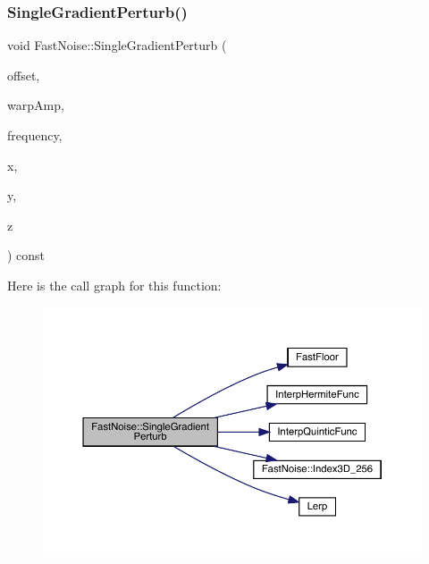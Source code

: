 \subsubsection{\texorpdfstring{Single\+Gradient\+Perturb()}{SingleGradientPerturb()}\hspace{0.1cm}{\footnotesize\ttfamily [2/2]}}
{\footnotesize\ttfamily void Fast\+Noise\+::\+Single\+Gradient\+Perturb (\begin{DoxyParamCaption}\item[{unsigned char}]{offset,  }\item[{\mbox{\hyperlink{_fast_noise_8h_a75a9ef6d2541c4921815b885bfd449c3}{F\+N\+\_\+\+D\+E\+C\+I\+M\+AL}}}]{warp\+Amp,  }\item[{\mbox{\hyperlink{_fast_noise_8h_a75a9ef6d2541c4921815b885bfd449c3}{F\+N\+\_\+\+D\+E\+C\+I\+M\+AL}}}]{frequency,  }\item[{\mbox{\hyperlink{_fast_noise_8h_a75a9ef6d2541c4921815b885bfd449c3}{F\+N\+\_\+\+D\+E\+C\+I\+M\+AL}} \&}]{x,  }\item[{\mbox{\hyperlink{_fast_noise_8h_a75a9ef6d2541c4921815b885bfd449c3}{F\+N\+\_\+\+D\+E\+C\+I\+M\+AL}} \&}]{y,  }\item[{\mbox{\hyperlink{_fast_noise_8h_a75a9ef6d2541c4921815b885bfd449c3}{F\+N\+\_\+\+D\+E\+C\+I\+M\+AL}} \&}]{z }\end{DoxyParamCaption}) const\hspace{0.3cm}{\ttfamily [private]}}

Here is the call graph for this function\+:
\nopagebreak
\begin{figure}[H]
\begin{center}
\leavevmode
\includegraphics[width=350pt]{d1/dd8/class_fast_noise_ac584dcaa35fdc6d8af986eba0d3ed50e_cgraph}
\end{center}
\end{figure}
\mbox{\label{class_fast_noise_a2dd412856eb0d588fe8fbcb529517455}} 
